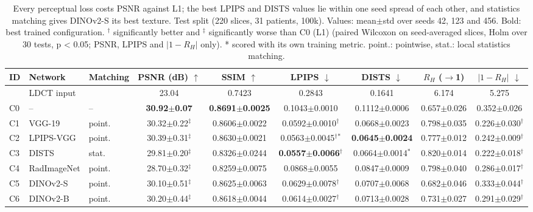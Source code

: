 \begin{table}[t]
\centering
\small
\setlength{\tabcolsep}{3pt}
\caption{Every perceptual loss costs PSNR against L1; the best LPIPS and DISTS values lie within one seed spread of each other, and statistics matching gives DINOv2-S its best texture. Test split (220 slices, 31 patients, 100k). Values: mean$\pm$std over seeds 42, 123 and 456. Bold: best trained configuration. $^{\dagger}$ significantly better and $^{\ddagger}$ significantly worse than C0 (L1) (paired Wilcoxon on seed-averaged slices, Holm over 30 tests, p < 0.05; PSNR, LPIPS and $|1-R_H|$ only). * scored with its own training metric. point.: pointwise, stat.: local statistics matching.}
\label{tab:results}
\begin{tabular}{lllcccccc}
\toprule
ID & Network & Matching & PSNR (dB) $\uparrow$ & SSIM $\uparrow$ & LPIPS $\downarrow$ & DISTS $\downarrow$ & $R_H$ ($\to$1) & $|1-R_H|$ $\downarrow$ \\
\midrule
 & LDCT input &  & 23.04 & 0.7423 & 0.2843 & 0.1641 & 6.174 & 5.275 \\
C0 & -- & -- & \textbf{30.92$\pm$0.07} & \textbf{0.8691$\pm$0.0025} & 0.1043$\pm$0.0010 & 0.1112$\pm$0.0006 & 0.657$\pm$0.026 & 0.352$\pm$0.026 \\
C1 & VGG-19 & point. & 30.32$\pm$0.22$^{\ddagger}$ & 0.8606$\pm$0.0022 & 0.0592$\pm$0.0010$^{\dagger}$ & 0.0668$\pm$0.0023 & 0.798$\pm$0.035 & 0.226$\pm$0.030$^{\dagger}$ \\
C2 & LPIPS-VGG & point. & 30.39$\pm$0.31$^{\ddagger}$ & 0.8630$\pm$0.0021 & 0.0563$\pm$0.0045$^{\dagger}${}$^{*}$ & \textbf{0.0645$\pm$0.0024} & 0.777$\pm$0.012 & 0.242$\pm$0.009$^{\dagger}$ \\
C3 & DISTS & stat. & 29.81$\pm$0.20$^{\ddagger}$ & 0.8326$\pm$0.0244 & \textbf{0.0557$\pm$0.0066}$^{\dagger}$ & 0.0664$\pm$0.0014$^{*}$ & 0.820$\pm$0.014 & 0.222$\pm$0.018$^{\dagger}$ \\
C4 & RadImageNet & point. & 28.70$\pm$0.32$^{\ddagger}$ & 0.8259$\pm$0.0075 & 0.0868$\pm$0.0055 & 0.0847$\pm$0.0009 & 0.798$\pm$0.040 & 0.286$\pm$0.017$^{\dagger}$ \\
C5 & DINOv2-S & point. & 30.10$\pm$0.51$^{\ddagger}$ & 0.8625$\pm$0.0063 & 0.0629$\pm$0.0078$^{\dagger}$ & 0.0707$\pm$0.0068 & 0.682$\pm$0.046 & 0.333$\pm$0.044$^{\dagger}$ \\
C6 & DINOv2-B & point. & 30.20$\pm$0.44$^{\ddagger}$ & 0.8618$\pm$0.0044 & 0.0614$\pm$0.0027$^{\dagger}$ & 0.0713$\pm$0.0028 & 0.731$\pm$0.027 & 0.291$\pm$0.029$^{\dagger}$ \\

\end{tabular}
\end{table}
